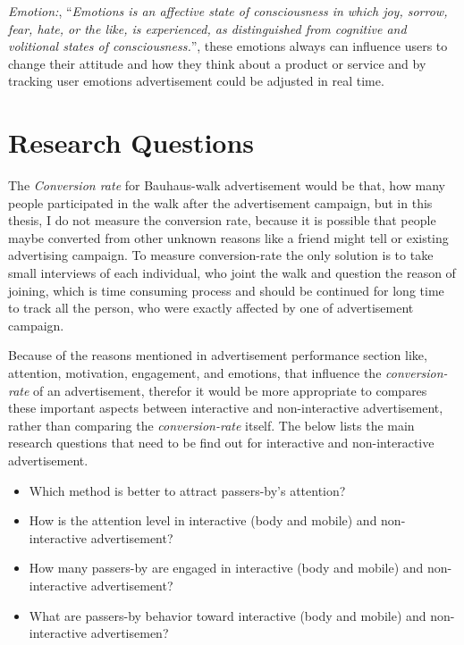 \emph{Emotion:}, ``\emph{Emotions is an affective state of consciousness in which joy, sorrow, fear, hate, or the like, is experienced, as distinguished from cognitive and volitional states of consciousness.}''\cite{emotiondef}, these emotions always can influence users to change their attitude and how they think about a product or service and by tracking user emotions advertisement could be adjusted in real time.




\section{Research Questions}
The \emph{Conversion rate} for Bauhaus-walk advertisement would be that, how many people participated in the walk after the advertisement campaign, but in this thesis, I do not measure the conversion rate, because it is possible that people maybe converted from other unknown reasons like a friend might tell or existing advertising campaign. To measure conversion-rate the only solution is to take small interviews of each individual, who joint the walk and question the reason of joining, which is time consuming process and should be continued for long time to track all the person, who were exactly affected by one of advertisement campaign.

Because of the reasons mentioned in advertisement performance section like, attention, motivation, engagement, and emotions, that influence the \emph{conversion-rate} of an advertisement, therefor it would be more appropriate to compares these important aspects between interactive and non-interactive advertisement, rather than comparing the \emph{conversion-rate} itself. The below lists the main research questions that need to be find out for interactive and non-interactive advertisement.


\begin{itemize}
\item Which method is better to attract passers-by's attention? 
\item How is the attention level in interactive (body and mobile) and non-interactive advertisement?
\item How many passers-by are engaged in interactive (body and mobile) and non-interactive advertisement?
\item What are passers-by behavior toward interactive (body and mobile) and non-interactive advertisemen?
\end{itemize}

